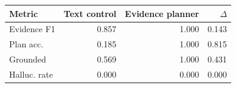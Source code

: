 \begin{tabular}{lrrr}
\toprule
Metric & Text control & Evidence planner & $\Delta$ \\
\midrule
Evidence F1 & 0.857 & 1.000 & 0.143 \\
Plan acc. & 0.185 & 1.000 & 0.815 \\
Grounded & 0.569 & 1.000 & 0.431 \\
Halluc. rate & 0.000 & 0.000 & 0.000 \\
\bottomrule
\end{tabular}
